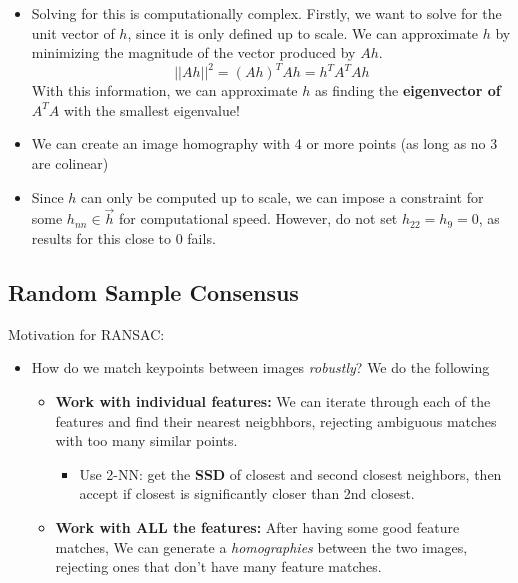 \documentclass{article}
\begin{document}
\begin{itemize}
    \item Solving for this is computationally complex. Firstly, we want to solve for the unit vector of $h$, since it is only defined up to scale. We can approximate $h$ by minimizing the magnitude of the vector produced by $Ah$.
    $$||Ah||^2 = (Ah)^TAh = h^TA^TAh$$
    With this information, we can approximate $h$ as finding the \textbf{eigenvector of} $A^TA$ with the smallest eigenvalue!
    \item We can create an image homography with 4 or more points (as long as no 3 are colinear)
    \item Since $h$ can only be computed up to scale, we can impose a constraint for some $h_{nn} \in \vec{h}$ for computational speed. However, do not set $h_{22} = h_9 = 0$, as results for this close to 0 fails.
\end{itemize}
\subsection{Random Sample Consensus}
Motivation for RANSAC:
\begin{itemize}
    \item How do we match keypoints between images \textit{robustly}? We do the following
    \begin{itemize}
        \item \textbf{Work with individual features:} We can iterate through each of the features and find their nearest neigbhbors, rejecting ambiguous matches with too many similar points.
        \begin{itemize}
            \item Use 2-NN: get the \textbf{SSD} of closest and second closest neighbors, then accept if closest is significantly closer than 2nd closest. 
        \end{itemize}
        \item \textbf{Work with ALL the features:} After having some good feature matches, We can generate a \textit{homographies} between the two images, rejecting ones that don't have many feature matches.
    \end{itemize}
\end{itemize}
\end{document}
